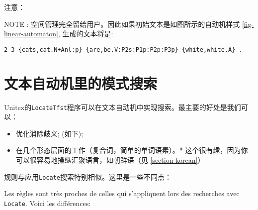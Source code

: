 \bigskip
\noindent 
注意：

NOTE : 空间管理完全留给用户。因此如果初始文本是如图所示的自动机样式
\ref{fig-linear-automaton}, 生成的文本将是:

\begin{verbatim}
2 3 {cats,cat.N+Anl:p} {are,be.V:P2s:P1p:P2p:P3p} {white,white.A} .
\end{verbatim}


\section{文本自动机里的模式搜索}
\label{section-locate-tfst}
Unitex的\verb+LocateTfst+程序可以在文本自动机中实现搜索。最主要的好处是我们可以：

\begin{itemize}
\item 优化消除歧义;
 (如下);
    \item 
在几个形态层面的工作（复合词，简单的单词语素）。*
这个很有趣，因为你可以很容易地操纵汇聚语言，如朝鲜语（见 \ref{section-korean}）
\end{itemize}

 
\bigskip
\noindent
规则与应用\verb+Locate+搜索特别相似。这里是一些不同点：




Les règles sont très proches de celles qui s'appliquent lors des recherches avec
\verb+Locate+. Voici les différences:

